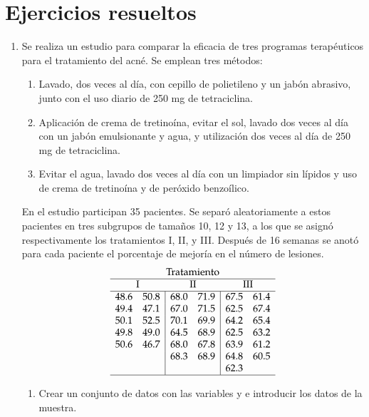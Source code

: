 \section{Ejercicios resueltos}
\begin {enumerate}[leftmargin=*]

\item Se realiza un estudio para comparar la eficacia de tres programas terapéuticos para el tratamiento del acné. Se
emplean tres métodos:
\begin{enumerate}
\item Lavado, dos veces al día, con cepillo de polietileno y un jabón abrasivo, junto con el uso diario de 250 mg de
tetraciclina.
\item Aplicación de crema de tretinoína, evitar el sol, lavado dos veces al día con un jabón emulsionante y agua, y
utilización dos veces al día de 250 mg de tetraciclina.
\item Evitar el agua, lavado dos veces al día con un limpiador sin lípidos y uso de crema de tretinoína y de peróxido
benzoílico.
\end{enumerate}
En el estudio participan 35 pacientes. Se separó aleatoriamente a estos pacientes en tres subgrupos de tamaños 10, 12 y
13, a los que se asignó respectivamente los tratamientos I, II, y III.
Después de 16 semanas se anotó para cada paciente el porcentaje de mejoría en el número de lesiones.
\[
\begin{array}{ll|ll|ll}
\multicolumn{6}{c}{\text{Tratamiento}} \\
\hline
\multicolumn{2}{c}{\text{I}} & \multicolumn{2}{c}{\text{II}} & \multicolumn{2}{c}{\text{III}} \\
\hline
48.6 & 50.8 & 68.0 & 71.9 & 67.5 & 61.4 \\
49.4 & 47.1 & 67.0 & 71.5 & 62.5 & 67.4 \\
50.1 & 52.5 & 70.1 & 69.9 & 64.2 & 65.4 \\
49.8 & 49.0 & 64.5 & 68.9 & 62.5 & 63.2 \\
50.6 & 46.7 & 68.0 & 67.8 & 63.9 & 61.2 \\
     &      & 68.3 & 68.9 & 64.8 & 60.5 \\
     &      &      &      & 62.3 &      \\
\hline
\end{array}
\]
\begin{enumerate}
\item Crear un conjunto de datos con las variables  y  e introducir los datos de
la muestra.


\end{enumerate}
\end{enumerate}
